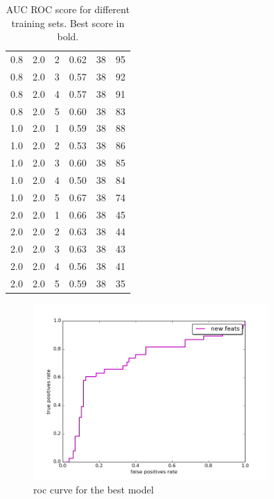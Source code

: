 \documentclass{article}
\begin{document}
\begin{table}[!h]
\begin{tabular}{c  c  c | c  c c}
		0.8 & 2.0 & 2 & 0.62 & 38 & 95\\
		0.8 & 2.0 & 3 & 0.57 & 38 & 92\\
		0.8 & 2.0 & 4 & 0.57 & 38 & 91\\
		0.8 & 2.0 & 5 & 0.60 & 38 & 83\\
		1.0 & 2.0 & 1 & 0.59 & 38 & 88\\
		1.0 & 2.0 & 2 & 0.53 & 38 & 86\\
		1.0 & 2.0 & 3 & 0.60 & 38 & 85\\
		1.0 & 2.0 & 4 & 0.50 & 38 & 84\\
		1.0 & 2.0 & 5 & 0.67 & 38 & 74\\
		2.0 & 2.0 & 1 & 0.66 & 38 & 45\\
		2.0 & 2.0 & 2 & 0.63 & 38 & 44\\
		2.0 & 2.0 & 3 & 0.63 & 38 & 43\\
		2.0 & 2.0 & 4 & 0.56 & 38 & 41\\
		2.0 & 2.0 & 5 & 0.59 & 38 & 35\\

	\end{tabular}
	\caption{AUC ROC score for different training sets. Best score in bold.}
	\label{table:exp_res}
\end{table}


\begin{figure}[!h]
	\centering
	\includegraphics[width= 0.8\textwidth]{roc.png}
	\caption{roc curve for the best model}
	\label{fig:roc_best}
\end{figure}
\end{document}
